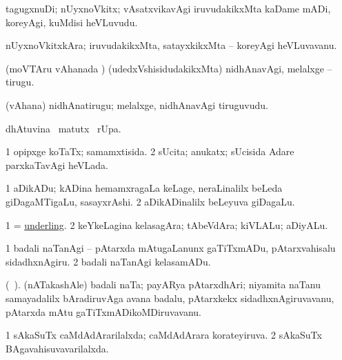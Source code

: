 \bentry
{} 
\gl{\nA}
\expl{}
\bmng
 tagugxnuDi; nUyxnoVkitx; vAsatxvikavAgi iruvudakikxMta kaDame mADi, koreyAgi, kuMdisi heVLuvudu. 
\emng
\eentry

\bentry
{} 
\gl{\nA}
\expl{}
\bmng
 nUyxnoVkitxkAra; iruvudakikxMta, satayxkikxMta -- koreyAgi heVLuvavanu. 
\emng
\eentry

\bentry
{} 
\gl{\akirx}
\expl{}
\bmng
 (moVTAru vAhanada \vi) (udedxVshisidudakikxMta) nidhAnavAgi, melalxge -- tirugu. 
\emng
\eentry

\bentry
{} 
\gl{\nA}
\expl{}
\bmng
 (vAhana) nidhAnatirugu; melalxge, nidhAnavAgi tiruguvudu. 
\emng
\eentry

\bentry
{} 
\gl{\kirx}
\expl{}
\bmng
  dhAtuvina \BU\ matutx \BUkaq\ rUpa. 
\emng
\eentry

\bentry
{} 
\gl{\gu}
\expl{}
\bmng
\bnum
\num{1} opipxge koTaTx; samamxtisida. 
\num{2} sUcita; anukatx; sUcisida Adare parxkaTavAgi heVLada. 
\enum
\emng
\eentry

\bentry
{} 
\gl{\nA}
\bmng
\bnum
\num{1} aDikADu; kADina hemamxragaLa keLage, neraLinalilx beLeda giDagaMTigaLu, sasayxrAshi. 
\num{2} aDikADinalilx beLeyuva giDagaLu. 
\enum
\emng
\eentry

\bentry
{} 
\gl{\nA}
\expl{}
\bmng
\bnum
\num{1} = \hyperlink{underling}{underling}. 
\num{2} keYkeLagina kelasagAra; tAbeVdAra; kiVLALu; aDiyALu. 
\enum
\emng
\eentry

\bentry
{} 
\gl{\sakirx}
\bmng
\bnum
\num{1} badali naTanAgi -- pAtarxda mAtugaLanunx gaTiTxmADu, pAtarxvahisalu sidadhxnAgiru. 
\num{2} badali naTanAgi kelasamADu. 
\enum
\emng
\eentry

\bentry
{} 
\gl{\nA}
\expl{}
\bmng
 (\bava\ ). (nATakashAle) badali naTa; payARya pAtarxdhAri; niyamita naTanu samayadalilx bAradiruvAga avana badalu, pAtarxkekx sidadhxnAgiruvavanu, pAtarxda mAtu gaTiTxmADikoMDiruvavanu. 
\emng
\eentry

\bentry
{} 
\gl{\gu}
\expl{}
\bmng
\bnum
\num{1} sAkaSuTx caMdAdArarilalxda; caMdAdArara korateyiruva. 
\num{2} sAkaSuTx BAgavahisuvavarilalxda. 
\enum
\emng
\eentry

